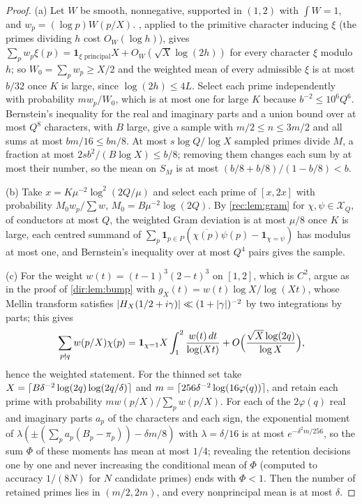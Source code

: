 \begin{proof}
(a) Let $W$ be smooth, nonnegative, supported in $(1,2)$ with $\int W=1$, and $w_p=(\log p)W(p/X)$.
, applied to the primitive character inducing $\xi$ (the primes dividing $h$ cost
$O_W(\log h)$), gives $\sum_pw_p\xi(p)=\mathbf 1_{\xi\text{ principal}}X+O_W(\sqrt X\log(2h))$ for every character $\xi$
modulo $h$; so
$W_0=\sum_pw_p\ge X/2$ and the weighted mean of every admissible $\xi$ is at most $b/32$ once $K$ is large,
since $\log(2h)\le4L$. Select each prime independently with probability $mw_p/W_0$, which is at most one
for large $K$ because $b^{-2}\le10^6Q^6$. Bernstein's inequality for the real and imaginary parts and a
union bound over at most $Q^8$ characters, with $B$ large, give a sample with $m/2\le n\le3m/2$ and all
sums at most $bm/16\le bn/8$. At most $s\log Q/\log X$ sampled primes divide $M$, a fraction at most
$2sb^2/(B\log X)\le b/8$; removing them changes each sum by at most their number, so the mean on $S_M$ is
at most $(b/8+b/8)/(1-b/8)<b$.

(b) Take $x=K\mu^{-2}\log^2(2Q/\mu)$ and select each prime of $[x,2x]$ with probability $M_0w_p/\sum w$,
$M_0=B\mu^{-2}\log(2Q)$. By \cref{rec:lem:gram} for $\chi,\psi\in\mathcal X_Q$, of conductors at most $Q$, the weighted
Gram deviation is at most $\mu/8$ once $K$ is large, each centred summand of
$\sum_p\mathbf 1_{p\in P}(\overline{\chi(p)}\psi(p)-\mathbf 1_{\chi=\psi})$ has modulus at most one, and Bernstein's inequality
over at most $Q^4$ pairs gives the sample.

(c) For the weight $w(t)=(t-1)^3(2-t)^3$ on $[1,2]$, which is $C^2$, argue as in the proof of \cref{dir:lem:bump}
with $g_X(t)=w(t)\log X/\log(Xt)$, whose Mellin transform satisfies $\lvert H_X(1/2+i\gamma)\rvert\ll(1+\lvert\gamma\rvert)^{-2}$ by
two integrations by parts; this gives
\[
 \sum_{p\nmid q}w(p/X)\chi(p)=\mathbf 1_{\chi=1}X\int_1^2\frac{w(t)\,dt}{\log(Xt)}+O\Bigl(\frac{\sqrt X\log(2q)}{\log X}\Bigr),
\]
hence the weighted statement. For the thinned set take $X=\lceil B\delta^{-2}\log(2q)\log(2q/\delta)\rceil$ and
$m=\lceil256\delta^{-2}\log(16\varphi(q))\rceil$, and retain each prime with probability $mw(p/X)/\sum_pw(p/X)$.
For each of the $2\varphi(q)$ real and imaginary parts $a_p$ of the characters and each sign, the exponential
moment of $\lambda(\pm(\sum_pa_p(B_p-\pi_p))-\delta m/8)$ with $\lambda=\delta/16$ is at most
$e^{-\delta^2m/256}$, so the sum $\Phi$ of these moments has mean at most $1/4$; revealing the retention
decisions one by one and never increasing the conditional mean of $\Phi$ (computed to accuracy $1/(8N)$
for $N$ candidate primes) ends with $\Phi<1$. Then the number of retained primes lies in $(m/2,2m)$, and
every nonprincipal mean is at most $\delta$.
\end{proof}


